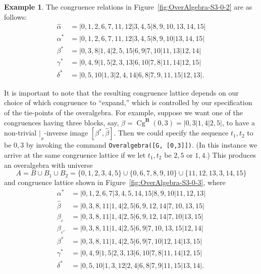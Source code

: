 \documentclass{au}
\numberwithin{equation}{section}
\theoremstyle{plain}
\theoremstyle{definition}
\newtheorem{example}[theorem]{Example}
\newcommand{\<}{\ensuremath{\langle}}
\renewcommand{\>}{\ensuremath{\rangle}}
\newcommand{\bB}{\ensuremath{\mathbf{B}}}
\DeclareMathOperator{\Cg}{Cg}
\newcommand{\resB}{\ensuremath{|_{_B}}}
\newcommand{\eps}{\ensuremath{\varepsilon}}
\begin{document}
\begin{example}
The congruence relations in Figure~\ref{fig:OverAlgebra-S3-0-2} are as
follows:
 \begin{align*}
 \widehat{\alpha} &=|0,1,2,6,7,11,12|3,4,5|8,9,10,13,14,15| \\
 \alpha^* &=|0,1,2,6,7,11,12|3,4,5|8,9,10|13,14,15| \\
 \beta^*&=|0,3,8|1,4|2,5,15|6,9|7,10|11,13|12,14| \\
 \gamma^*&=|0,4,9|1,5|2,3,13|6,10|7,8|11,14|12,15| \\
 \delta^*&=|0,5,10|1,3|2,4,14|6,8|7,9,11,15|12,13|.
 \end{align*}

It is important to note that the resulting congruence lattice depends
on our choice of which congruence to ``expand,'' which is controlled by
our specification of the tie-points of the overalgebra.
For example, suppose we want one of the congruences having three
blocks, say, $\beta = \Cg^\bB(0,3) =| 0, 3 | 1, 4 | 2, 5 |$, to have a
non-trivial $\resB$-inverse image $[\beta^*, \widehat{\beta}]$.  Then we could
specify the sequence $t_1, t_2$ to be $0, 3$ by invoking
the command
{\tt Overalgebra([G, [0,3]])}. (In this instance we arrive at the same congruence
  lattice if we let $t_1, t_2$ be $2, 5$ or $1, 4$.)
This produces an overalgebra with universe
\[
A = B \cup B_1 \cup B_2
 = \{0, 1,  2,  3,  4,  5\} \cup \{ 0, 6,  7,  8,  9, 10\} \cup
\{11, 12, 13, 3, 14, 15\}
\]
and congruence lattice shown in Figure~\ref{fig:OverAlgebra-S3-0-3},
where
 \begin{align*}
 \alpha^* &=|0,1,2,6,7|3,4,5,14,15|8,9,10|11,12,13| \\
 \widehat{\beta} &=|0,3,8,11|1,4|2,5|6,9,12,14|7,10,13,15| \\
 \beta_{\eps}&=|0,3,8,11|1,4|2,5|6,9,12,14|7,10|13,15| \\
 \beta_{\eps'}&=|0,3,8,11|1,4|2,5|6,9|7,10,13,15|12,14| \\
 \beta^*&=|0,3,8,11|1,4|2,5|6,9|7,10|12,14|13,15| \\
 \gamma^*&=|0,4,9|1,5|2,3,13|6,10|7,8|11,14|12,15| \\
 \delta^*&=|0,5,10|1,3,12|2,4|6,8|7,9|11,15|13,14|.
 \end{align*}



\end{example}
\end{document}
